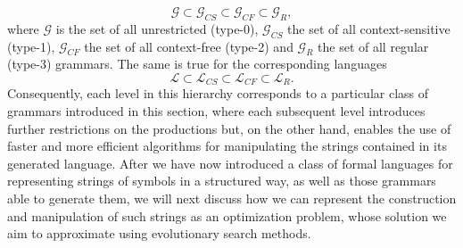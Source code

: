\begin{equation*}
	\mathcal{G} \subset \mathcal{G}_{CS} \subset \mathcal{G}_{CF} \subset \mathcal{G}_{R}, 
\end{equation*} 
where $\mathcal{G}$ is the set of all unrestricted (type-0), $\mathcal{G}_{CS}$ the set of all context-sensitive (type-1), $\mathcal{G}_{CF}$ the set of all context-free (type-2) and $\mathcal{G}_{R}$ the set of all regular (type-3) grammars.
The same is true for the corresponding languages
\begin{equation*}
	\mathcal{L} \subset \mathcal{L}_{CS} \subset \mathcal{L}_{CF} \subset \mathcal{L}_{R}. 
\end{equation*}
Consequently, each level in this hierarchy corresponds to a particular class of grammars introduced in this section, where each subsequent level introduces further restrictions on the productions but, on the other hand, enables the use of faster and more efficient algorithms for manipulating the strings contained in its generated language.
After we have now introduced a class of formal languages for representing strings of symbols in a structured way, as well as those grammars able to generate them, we will next discuss how we can represent the construction and manipulation of such strings as an optimization problem, whose solution we aim to approximate using evolutionary search methods.